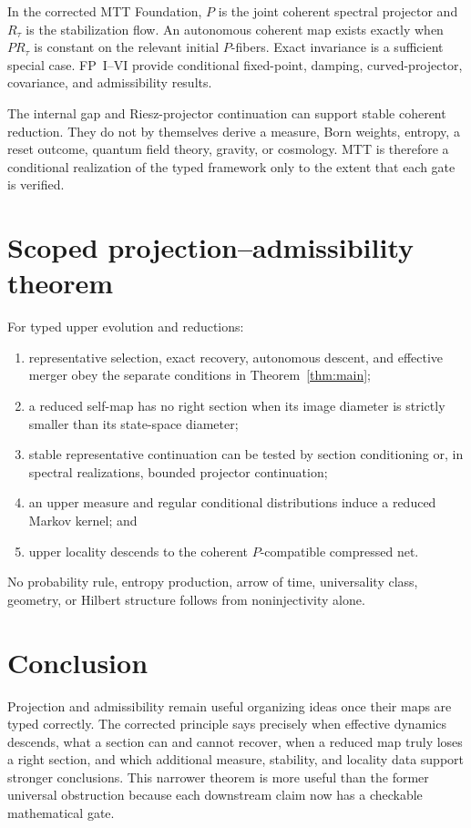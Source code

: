 \documentclass[11pt]{article}
\begin{document}
In the corrected MTT Foundation, $P$ is the joint coherent spectral projector
and $R_\tau$ is the stabilization flow. An autonomous coherent map exists
exactly when $P R_\tau$ is constant on the relevant initial $P$-fibers. Exact
invariance is a sufficient special case. FP~I--VI provide conditional
fixed-point, damping, curved-projector, covariance, and admissibility results.

The internal gap and Riesz-projector continuation can support stable coherent
reduction. They do not by themselves derive a measure, Born weights, entropy,
a reset outcome, quantum field theory, gravity, or cosmology. MTT is therefore
a conditional realization of the typed framework only to the extent that each
gate is verified.

\section{Scoped projection--admissibility theorem}

\begin{theorem}\label{thm:scope}
For typed upper evolution and reductions:
\begin{enumerate}
\item representative selection, exact recovery, autonomous descent, and
effective merger obey the separate conditions in Theorem~\ref{thm:main};
\item a reduced self-map has no right section when its image diameter is
strictly smaller than its state-space diameter;
\item stable representative continuation can be tested by section
conditioning or, in spectral realizations, bounded projector continuation;
\item an upper measure and regular conditional distributions induce a reduced
Markov kernel; and
\item upper locality descends to the coherent $P$-compatible compressed net.
\end{enumerate}
No probability rule, entropy production, arrow of time, universality class,
geometry, or Hilbert structure follows from noninjectivity alone.
\end{theorem}

\section{Conclusion}

Projection and admissibility remain useful organizing ideas once their maps
are typed correctly. The corrected principle says precisely when effective
dynamics descends, what a section can and cannot recover, when a reduced map
truly loses a right section, and which additional measure, stability, and
locality data support stronger conclusions. This narrower theorem is more
useful than the former universal obstruction because each downstream claim
now has a checkable mathematical gate.
\end{document}
